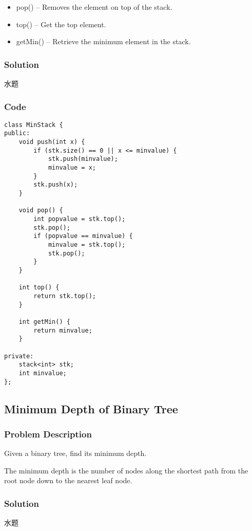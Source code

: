 \documentclass[courier]{article}
\begin{document}
\begin{CJK*}{UTF8}{gkai}
\begin{itemize}
\item 
pop() -- Removes the element on top of the stack.

\item 
top() -- Get the top element.

\item 
getMin() -- Retrieve the minimum element in the stack.

\end{itemize}



\subsubsection*{Solution}
水题

\subsubsection*{Code}
\begin{lstlisting}
class MinStack {
public:
    void push(int x) {
        if (stk.size() == 0 || x <= minvalue) {
            stk.push(minvalue);
            minvalue = x;
        }
        stk.push(x);
    }
    
    void pop() {
        int popvalue = stk.top();
        stk.pop();
        if (popvalue == minvalue) {
            minvalue = stk.top();
            stk.pop();
        }
    }
    
    int top() {
        return stk.top();
    }
    
    int getMin() {
        return minvalue;
    }
    
private:
    stack<int> stk;
    int minvalue;
}; 
\end{lstlisting}


\subsection{ Minimum Depth of Binary Tree }

\subsubsection*{Problem Description}
Given a binary tree, find its minimum depth.

The minimum depth is the number of nodes along the shortest path from the root node down to the nearest leaf node.



\subsubsection*{Solution}
水题


\end{CJK*}
\end{document}
